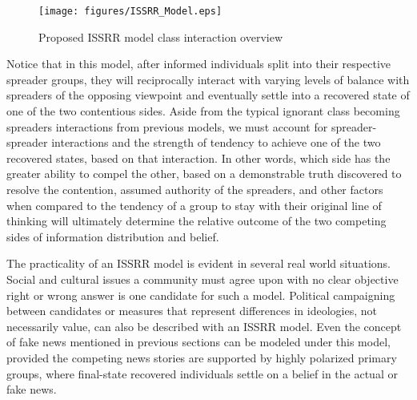 \begin{figure}[!htbp] \centering
  \texttt{[image: figures/ISSRR\_Model.eps]}
  \caption{Proposed ISSRR model class interaction overview}
  \label{fig:ISSRR_Model}
\end{figure}

Notice that in this model, after informed individuals split into their respective spreader groups, they will reciprocally interact with varying levels of balance with spreaders of the opposing viewpoint and eventually settle into a recovered state of one of the two contentious sides. Aside from the typical ignorant class becoming spreaders interactions from previous models, we must account for spreader-spreader interactions and the strength of tendency to achieve one of the two recovered states, based on that interaction. In other words, which side has the greater ability to compel the other, based on a demonstrable truth discovered to resolve the contention, assumed authority of the spreaders, and other factors when compared to the tendency of a group to stay with their original line of thinking will ultimately determine the relative outcome of the two competing sides of information distribution and belief. 

The practicality of an ISSRR model is evident in several real world situations. Social and cultural issues a community must agree upon with no clear objective right or wrong answer is one candidate for such a model. Political campaigning between candidates or measures that represent differences in ideologies, not necessarily value, can also be described with an ISSRR model. Even the concept of fake news mentioned in previous sections can be modeled under this model, provided the competing news stories are supported by highly polarized primary groups, where final-state recovered individuals settle on a belief in the actual or fake news.

